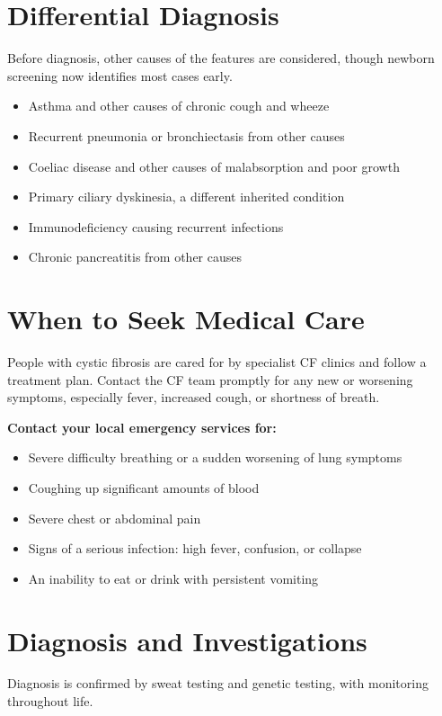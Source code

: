 \section*{Differential Diagnosis}
Before diagnosis, other causes of the features are considered, though newborn screening now identifies most cases early.

\begin{itemize}
    \item Asthma and other causes of chronic cough and wheeze
    \item Recurrent pneumonia or bronchiectasis from other causes
    \item Coeliac disease and other causes of malabsorption and poor growth
    \item Primary ciliary dyskinesia, a different inherited condition
    \item Immunodeficiency causing recurrent infections
    \item Chronic pancreatitis from other causes
\end{itemize}

\section*{When to Seek Medical Care}
People with cystic fibrosis are cared for by specialist CF clinics and follow a treatment plan. Contact the CF team promptly for any new or worsening symptoms, especially fever, increased cough, or shortness of breath.

\textbf{Contact your local emergency services for:}
\begin{itemize}
    \item Severe difficulty breathing or a sudden worsening of lung symptoms
    \item Coughing up significant amounts of blood
    \item Severe chest or abdominal pain
    \item Signs of a serious infection: high fever, confusion, or collapse
    \item An inability to eat or drink with persistent vomiting
\end{itemize}

\section*{Diagnosis and Investigations}
Diagnosis is confirmed by sweat testing and genetic testing, with monitoring throughout life.

